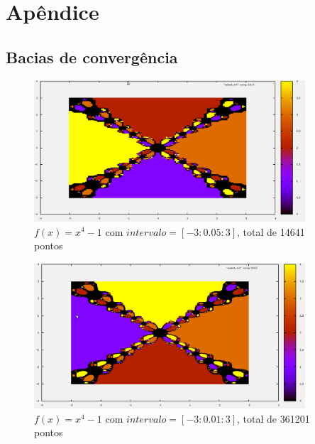 
\chapter{Apêndice}\label{chap:appendix}
\section{Bacias de convergência}
  \begin{figure}[htp]
    \centering
    \includegraphics[width=0.9\textwidth]{imgs/img1.png}
    \caption{$f(x) = x^4 -1$ com $intervalo = [-3: 0.05: 3]$, total de 14641 pontos}
  \end{figure}

  \begin{figure}[htp]
    \centering
    \includegraphics[width=0.9\textwidth]{imgs/img2.png}
    \caption{$f(x) = x^4 -1$ com $intervalo = [-3: 0.01: 3]$, total de 361201 pontos}
  \end{figure}

